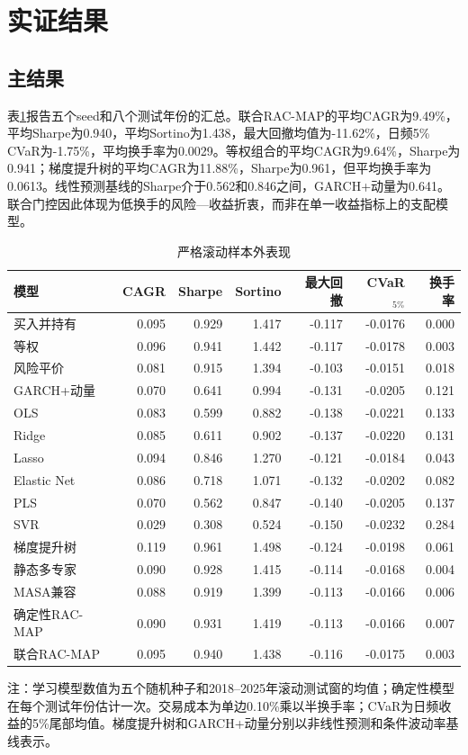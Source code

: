 \documentclass[UTF8,a4paper,zihao=-4]{ctexart}
\begin{document}
\section{实证结果}
\subsection{主结果}
表\ref{tab:main}报告五个seed和八个测试年份的汇总。联合RAC-MAP的平均CAGR为9.49\%，平均Sharpe为0.940，平均Sortino为1.438，最大回撤均值为-11.62\%，日频5\% CVaR为-1.75\%，平均换手率为0.0029。等权组合的平均CAGR为9.64\%，Sharpe为0.941；梯度提升树的平均CAGR为11.88\%，Sharpe为0.961，但平均换手率为0.0613。线性预测基线的Sharpe介于0.562和0.846之间，GARCH+动量为0.641。联合门控因此体现为低换手的风险—收益折衷，而非在单一收益指标上的支配模型。

\begin{table}[htbp]
\centering
\caption{严格滚动样本外表现}
\label{tab:main}
\begin{threeparttable}
\small
\begin{tabular}{lrrrrrr}
\toprule
模型 & CAGR & Sharpe & Sortino & 最大回撤 & CVaR$_{5\%}$ & 换手率 \\
\midrule
买入并持有 & 0.095 & 0.929 & 1.417 & -0.117 & -0.0176 & 0.000 \\
等权 & 0.096 & 0.941 & 1.442 & -0.117 & -0.0178 & 0.003 \\
风险平价 & 0.081 & 0.915 & 1.394 & -0.103 & -0.0151 & 0.018 \\
GARCH+动量 & 0.070 & 0.641 & 0.994 & -0.131 & -0.0205 & 0.121 \\
OLS & 0.083 & 0.599 & 0.882 & -0.138 & -0.0221 & 0.133 \\
Ridge & 0.085 & 0.611 & 0.902 & -0.137 & -0.0220 & 0.131 \\
Lasso & 0.094 & 0.846 & 1.270 & -0.121 & -0.0184 & 0.043 \\
Elastic Net & 0.086 & 0.718 & 1.071 & -0.132 & -0.0202 & 0.082 \\
PLS & 0.070 & 0.562 & 0.847 & -0.140 & -0.0205 & 0.137 \\
SVR & 0.029 & 0.308 & 0.524 & -0.150 & -0.0232 & 0.284 \\
梯度提升树 & 0.119 & 0.961 & 1.498 & -0.124 & -0.0198 & 0.061 \\
静态多专家 & 0.090 & 0.928 & 1.415 & -0.114 & -0.0168 & 0.004 \\
MASA兼容 & 0.088 & 0.919 & 1.399 & -0.113 & -0.0166 & 0.006 \\
确定性RAC-MAP & 0.090 & 0.931 & 1.419 & -0.113 & -0.0166 & 0.007 \\
联合RAC-MAP & 0.095 & 0.940 & 1.438 & -0.116 & -0.0175 & 0.003 \\
\bottomrule
\end{tabular}
\begin{tablenotes}[flushleft]
\item[]\footnotesize 注：学习模型数值为五个随机种子和2018--2025年滚动测试窗的均值；确定性模型在每个测试年份估计一次。交易成本为单边0.10\%乘以半换手率；CVaR为日频收益的5\%尾部均值。梯度提升树和GARCH+动量分别以非线性预测和条件波动率基线表示。
\end{tablenotes}
\end{threeparttable}
\end{table}
\end{document}
